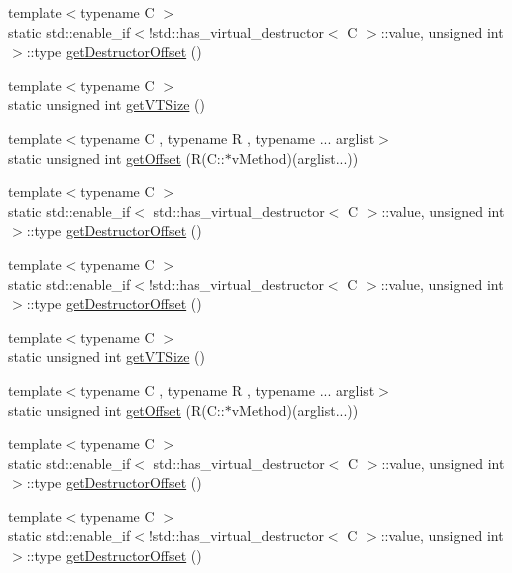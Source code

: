 \begin{DoxyCompactItemize}
\item 
{\footnotesize template$<$typename C $>$ }\\static std\+::enable\+\_\+if$<$!std\+::has\+\_\+virtual\+\_\+destructor$<$ C $>$\+::value, unsigned int $>$\+::type \mbox{\hyperlink{classfakeit_1_1VTUtils_ac13eea89df8b1656a1bedb9a9bb5c518}{get\+Destructor\+Offset}} ()
\item 
{\footnotesize template$<$typename C $>$ }\\static unsigned int \mbox{\hyperlink{classfakeit_1_1VTUtils_a54ddc7bb539671fbf957920f051a6104}{get\+V\+T\+Size}} ()
\item 
{\footnotesize template$<$typename C , typename R , typename ... arglist$>$ }\\static unsigned int \mbox{\hyperlink{classfakeit_1_1VTUtils_a0e019646d770355889228b1d88675530}{get\+Offset}} (R(C\+::$\ast$v\+Method)(arglist...))
\item 
{\footnotesize template$<$typename C $>$ }\\static std\+::enable\+\_\+if$<$ std\+::has\+\_\+virtual\+\_\+destructor$<$ C $>$\+::value, unsigned int $>$\+::type \mbox{\hyperlink{classfakeit_1_1VTUtils_a9c71030f6040b59ec03cbe326ae1d654}{get\+Destructor\+Offset}} ()
\item 
{\footnotesize template$<$typename C $>$ }\\static std\+::enable\+\_\+if$<$!std\+::has\+\_\+virtual\+\_\+destructor$<$ C $>$\+::value, unsigned int $>$\+::type \mbox{\hyperlink{classfakeit_1_1VTUtils_ac13eea89df8b1656a1bedb9a9bb5c518}{get\+Destructor\+Offset}} ()
\item 
{\footnotesize template$<$typename C $>$ }\\static unsigned int \mbox{\hyperlink{classfakeit_1_1VTUtils_a54ddc7bb539671fbf957920f051a6104}{get\+V\+T\+Size}} ()
\item 
{\footnotesize template$<$typename C , typename R , typename ... arglist$>$ }\\static unsigned int \mbox{\hyperlink{classfakeit_1_1VTUtils_a0e019646d770355889228b1d88675530}{get\+Offset}} (R(C\+::$\ast$v\+Method)(arglist...))
\item 
{\footnotesize template$<$typename C $>$ }\\static std\+::enable\+\_\+if$<$ std\+::has\+\_\+virtual\+\_\+destructor$<$ C $>$\+::value, unsigned int $>$\+::type \mbox{\hyperlink{classfakeit_1_1VTUtils_a9c71030f6040b59ec03cbe326ae1d654}{get\+Destructor\+Offset}} ()
\item 
{\footnotesize template$<$typename C $>$ }\\static std\+::enable\+\_\+if$<$!std\+::has\+\_\+virtual\+\_\+destructor$<$ C $>$\+::value, unsigned int $>$\+::type \mbox{\hyperlink{classfakeit_1_1VTUtils_ac13eea89df8b1656a1bedb9a9bb5c518}{get\+Destructor\+Offset}} ()

\end{DoxyCompactItemize}
